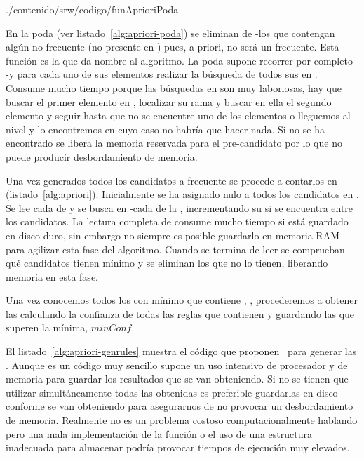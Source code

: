 
                 {./contenido/srw/codigo/funAprioriPoda}


En la poda (ver listado~\ref{alg:apriori-poda}) se eliminan de \aprioriL[k-1]-\aprioriC los \kitemsets que contengan algún \kitemsets[(k-1)] no frecuente (no presente en \aprioriL[k-1]) pues, a priori, no será un \kitemset frecuente. Esta función es la que da nombre al algoritmo. La poda supone recorrer por completo \aprioriL[k-1]-\aprioriC y para cada uno de sus elementos realizar la búsqueda de todos sus \kitemsets[(k-1)] en \aprioriL[k-1]. Consume mucho tiempo porque las búsquedas en \aprioriL[k-1] son muy laboriosas, hay que buscar el primer elemento en \aprioriL[1], localizar su rama \aprioriL[2] y buscar en ella el segundo elemento y seguir hasta que no se encuentre uno de los elementos o lleguemos al nivel \aprioriL[k-1] y lo encontremos en cuyo caso no habría que hacer nada. Si no se ha encontrado se libera la memoria reservada para el pre-candidato por lo que no puede producir desbordamiento de memoria.


Una vez generados todos los candidatos a \kitemset frecuente se procede a contarlos en \D (listado~\ref{alg:apriori}). Inicialmente se ha asignado \soporte nulo a todos los candidatos en \aprioriC. Se lee cada \transaccion de \D y se busca en \aprioriL[k-1]-\aprioriC cada \kitemset de la \transaccion, incrementando su \soporte si se encuentra entre los candidatos. La lectura completa de \D consume mucho tiempo si está guardado en disco duro, sin embargo no siempre es posible guardarlo en memoria RAM para agilizar esta fase del algoritmo. Cuando se termina de leer \D se comprueban qué candidatos tienen \soporte mínimo y se eliminan los que no lo tienen, liberando memoria en esta fase.







Una vez conocemos todos los \itemsets con \soporte mínimo que contiene \D, \aprioriL, procederemos a obtener las \ARs calculando la confianza de todas las reglas que contienen y guardando las que superen la \confianza mínima, $minConf$.

El listado~\ref{alg:apriori-genrules} muestra el código que proponen~\citeauthor{AgrawalSrikant-FastAlgorithmsForMiningAssociationRules-LARGO-1994} para generar las \ars. Aunque es un código muy sencillo supone un uso intensivo de procesador y de memoria para guardar los resultados que se van obteniendo. Si no se tienen que utilizar simultáneamente todas las \ars obtenidas es preferible guardarlas en disco conforme se van obteniendo para asegurarnos de no provocar un desbordamiento de memoria. Realmente no es un problema costoso computacionalmente hablando pero una mala implementación de la función o el uso de una estructura inadecuada para almacenar \aprioriL podría provocar tiempos de ejecución muy elevados.

